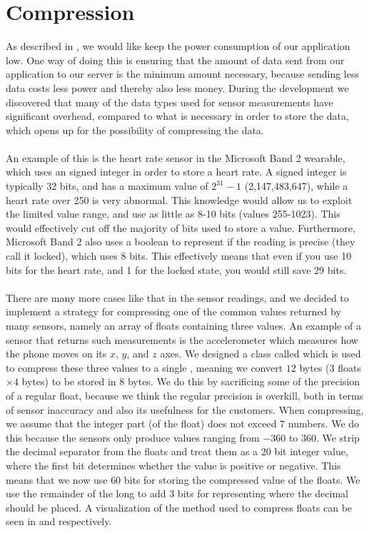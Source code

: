 
\section{Compression}
\label{sec:compression}

As described in , we would like keep the power consumption of our application low. One way of doing this is ensuring that the amount of data sent from our application to our server is the minimum amount necessary, because sending less data costs less power and thereby also less money. During the development we discovered that many of the data types used for sensor measurements have significant overhead, compared to what is necessary in order to store the data, which opens up for the possibility of compressing the data. 
\\\\
An example of this is the heart rate sensor in the Microsoft Band 2 wearable, which uses an signed integer in order to store a heart rate. A signed integer is typically 32 bits, and has a maximum value of $2^{31} - 1$ (2,147,483,647), while a heart rate over 250 is very abnormal. This knowledge would allow us to exploit the limited value range, and use as little as 8-10 bits (values 255-1023). This would effectively cut off the majority of bits used to store a value. Furthermore, Microsoft Band 2 also uses a boolean to represent if the reading is precise (they call it locked), which uses 8 bits. This effectively means that even if you use 10 bits for the heart rate, and 1 for the locked state, you would still save 29 bits.    
\\\\
There are many more cases like that in the sensor readings, and we decided to implement a strategy for compressing one of the common values returned by many sensors, namely an array of floats containing three values. An example of a sensor that returns such measurements is the accelerometer which measures how the phone moves on its $x$, $y$, and $z$ axes. We designed a class called  which is used to compress these three values to a single , meaning we convert $12$ bytes ($3$ floats $\times 4$ bytes) to be stored in $8$ bytes. We do this by sacrificing some of the precision of a regular float, because we think the regular precision is overkill, both in terms of sensor inaccuracy and also its usefulness for the customers. When compressing, we assume that the integer part (of the float) does not exceed $7$ numbers. We do this because the sensors only produce values ranging from $-360$ to $360$. We strip the decimal separator from the floats and treat them as a $20$ bit integer value, where the first bit determines whether the value is positive or negative. This means that we now use $60$ bits for storing the compressed value of the floats. We use the remainder of the long to add 3 bits for representing where the decimal should be placed. A visualization of the method used to compress floats can be seen in  and  respectively.

